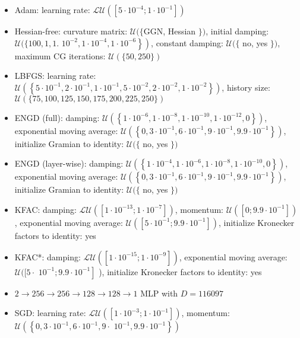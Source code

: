 \documentclass[10pt]{article}
\begin{document}
\begin{itemize}
  \item Adam: learning rate: $\mathcal{L U}\left(\left[5 \cdot 10^{-4} ; 1 \cdot 10^{-1}\right]\right)$
  \item Hessian-free: curvature matrix: $\mathcal{U}(\{\mathrm{GGN}$, Hessian $\})$, initial damping: $\mathcal{U}(\{100,1,1$. $\left.\left.10^{-2}, 1 \cdot 10^{-4}, 1 \cdot 10^{-6}\right\}\right)$, constant damping: $\mathcal{U}(\{$ no, yes $\})$, maximum CG iterations: $\mathcal{U}(\{50,250\})$
  \item LBFGS: learning rate: $\mathcal{U}\left(\left\{5 \cdot 10^{-1}, 2 \cdot 10^{-1}, 1 \cdot 10^{-1}, 5 \cdot 10^{-2}, 2 \cdot 10^{-2}, 1 \cdot 10^{-2}\right\}\right)$, history size: $\mathcal{U}(\{75,100,125,150,175,200,225,250\})$
  \item ENGD (full): damping: $\mathcal{U}\left(\left\{1 \cdot 10^{-6}, 1 \cdot 10^{-8}, 1 \cdot 10^{-10}, 1 \cdot 10^{-12}, 0\right\}\right)$, exponential moving average: $\mathcal{U}\left(\left\{0,3 \cdot 10^{-1}, 6 \cdot 10^{-1}, 9 \cdot 10^{-1}, 9.9 \cdot 10^{-1}\right\}\right)$, initialize Gramian to identity: $\mathcal{U}(\{$ no, yes $\})$
  \item ENGD (layer-wise): damping: $\mathcal{U}\left(\left\{1 \cdot 10^{-4}, 1 \cdot 10^{-6}, 1 \cdot 10^{-8}, 1 \cdot 10^{-10}, 0\right\}\right)$, exponential moving average: $\mathcal{U}\left(\left\{0,3 \cdot 10^{-1}, 6 \cdot 10^{-1}, 9 \cdot 10^{-1}, 9.9 \cdot 10^{-1}\right\}\right)$, initialize Gramian to identity: $\mathcal{U}(\{$ no, yes $\})$
  \item KFAC: damping: $\mathcal{L U}\left(\left[1 \cdot 10^{-13} ; 1 \cdot 10^{-7}\right]\right)$, momentum: $\mathcal{U}\left(\left[0 ; 9.9 \cdot 10^{-1}\right]\right)$, exponential moving average: $\mathcal{U}\left(\left[5 \cdot 10^{-1} ; 9.9 \cdot 10^{-1}\right]\right)$, initialize Kronecker factors to identity: yes
  \item KFAC*: damping: $\mathcal{L U}\left(\left[1 \cdot 10^{-15} ; 1 \cdot 10^{-9}\right]\right)$, exponential moving average: $\mathcal{U}([5 \cdot$ $\left.10^{-1} ; 9.9 \cdot 10^{-1}\right]$ ), initialize Kronecker factors to identity: yes
  \item $2 \rightarrow 256 \rightarrow 256 \rightarrow 128 \rightarrow 128 \rightarrow 1$ MLP with $D=116097$
  \item SGD: learning rate: $\mathcal{L U}\left(\left[1 \cdot 10^{-3} ; 1 \cdot 10^{-1}\right]\right)$, momentum: $\mathcal{U}\left(\left\{0,3 \cdot 10^{-1}, 6 \cdot 10^{-1}, 9 \cdot\right.\right.$ $\left.\left.10^{-1}, 9.9 \cdot 10^{-1}\right\}\right)$

\end{itemize}
\end{document}
